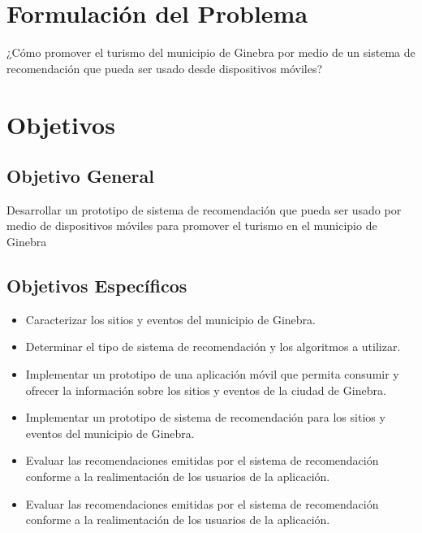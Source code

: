 \documentclass[12pt,letterpaper,openany]{book}
\begin{document}
\section{Formulación del Problema}
¿Cómo promover el turismo del municipio de Ginebra por medio de un sistema de recomendación que pueda ser usado desde dispositivos móviles?

\section{Objetivos}
\subsection{Objetivo General}
Desarrollar un prototipo de sistema de recomendación que pueda ser usado por medio de dispositivos móviles para promover el turismo en el municipio de Ginebra
\subsection{Objetivos Específicos}
\begin{itemize}
    \item Caracterizar los sitios y eventos del municipio de Ginebra.
    \item Determinar el tipo de sistema de recomendación y los algoritmos a utilizar.
    \item Implementar un prototipo de una aplicación móvil que permita consumir y ofrecer la información sobre los sitios y eventos de la ciudad de Ginebra.
    \item Implementar un prototipo de sistema de recomendación para los sitios y eventos del municipio de Ginebra.
    \item Evaluar las recomendaciones emitidas por el sistema de recomendación conforme a la realimentación de los usuarios de la aplicación.
    \item Evaluar las recomendaciones emitidas por el sistema de recomendación conforme a la realimentación de los usuarios de la aplicación.
\end{itemize}
\end{document}
